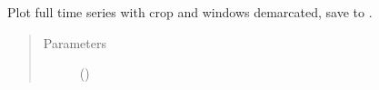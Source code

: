 \documentclass[letterpaper,10pt,openany,oneside,english]{sphinxmanual}
\begin{document}
\begin{fulllineitems}

\begin{fulllineitems}
\label{\detokenize{signals:signals.TimeSeries.plot_full}}
Plot full time series with crop and windows demarcated, save to
.
\begin{quote}\begin{description}
\item[{Parameters}] \leavevmode
{} () \textendash{} 

\end{description}\end{quote}

\end{fulllineitems}


\end{fulllineitems}

\end{document}
